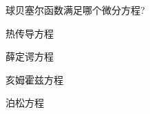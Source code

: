 \documentclass{njustexam}
\begin{document}




\begin{problem}
  球贝塞尔函数满足哪个微分方程? 

  \begin{abcd}
    \item 热传导方程
    \item 薛定谔方程
    \item 亥姆霍兹方程
    \item 泊松方程
  \end{abcd}
\end{problem}



  
\end{document}

